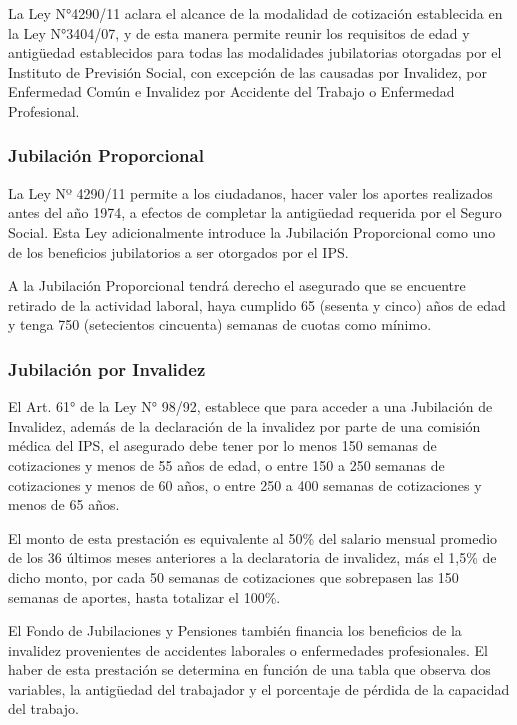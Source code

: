 La Ley N°4290/11 aclara el alcance de la modalidad de cotización establecida en la Ley N°3404/07, y de esta manera permite reunir los requisitos de edad y antigüedad establecidos para todas las modalidades jubilatorias otorgadas por el Instituto de Previsión Social, con excepción de las causadas por Invalidez, por Enfermedad Común e Invalidez por Accidente del Trabajo o Enfermedad Profesional.

\subsubsection{Jubilación Proporcional}

La Ley Nº 4290/11 permite a los ciudadanos, hacer valer los aportes realizados antes del año 1974, a efectos de completar la antigüedad requerida por el Seguro Social. Esta Ley adicionalmente introduce la Jubilación Proporcional como uno de los beneficios jubilatorios a ser otorgados por el IPS. 

A la Jubilación Proporcional tendrá derecho el asegurado que se encuentre retirado de la actividad laboral, haya cumplido 65 (sesenta y cinco) años de edad y tenga 750 (setecientos cincuenta) semanas de cuotas como mínimo.

\subsubsection{Jubilación por Invalidez}

El Art. 61° de la Ley N° 98/92, establece que para acceder a una Jubilación de Invalidez, además de la declaración de la invalidez por parte de una comisión médica del IPS, el asegurado debe tener por lo menos 150 semanas de cotizaciones y menos de 55 años de edad, o entre 150 a 250 semanas de cotizaciones y menos de 60 años, o entre 250 a 400 semanas de cotizaciones y menos de 65 años. 

El monto de esta prestación es equivalente al 50\% del salario mensual promedio de los 36 últimos meses anteriores a la declaratoria de invalidez, más el 1,5\% de dicho monto, por cada 50 semanas de cotizaciones que sobrepasen las 150 semanas de aportes, hasta totalizar el 100\%.

El Fondo de Jubilaciones y Pensiones también financia los beneficios de la invalidez provenientes de accidentes laborales o enfermedades profesionales. El haber de esta prestación se determina en función de una tabla que observa dos variables, la antigüedad del trabajador y el porcentaje de pérdida de la capacidad del trabajo. 

